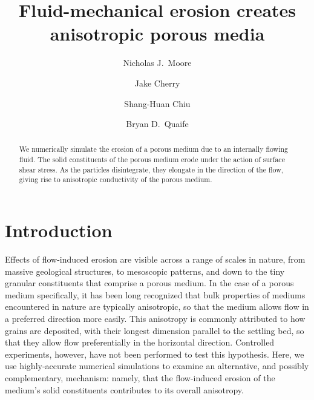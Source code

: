 \documentclass[3p]{elsarticle}
\begin{document}
\title{Fluid-mechanical erosion creates anisotropic porous media}



\author[Colgate]{Nicholas J.~Moore}

\author[FSU]{Jake Cherry}

\author[NJIT]{Shang-Huan Chiu}

\author[FSU]{Bryan D.~Quaife}

\address[Colgate]{Colgate University}
\address[FSU]{Florida State University}
\address[NJIT]{New Jersey Institute of Technology}

\begin{abstract}
We numerically simulate the erosion of a porous medium due to an internally flowing fluid.  The solid constituents of the porous medium erode under the action of surface shear stress. As the particles disintegrate, they elongate in the direction of the flow, giving rise to anisotropic conductivity of the porous medium.
\end{abstract}
\maketitle



\section{Introduction}

Effects of flow-induced erosion are visible across a range of scales in nature, from massive geological structures, to mesoscopic patterns, and down to the tiny granular constituents that comprise a porous medium. In the case of a porous medium specifically, it has been long recognized that bulk properties of mediums encountered in nature are typically anisotropic, so that the medium allows flow in a preferred direction more easily. This anisotropy is commonly attributed to how grains are deposited, with their longest dimension parallel to the settling bed, so that they allow flow preferentially in the horizontal direction. Controlled experiments, however, have not been performed to test this hypothesis. Here, we use highly-accurate numerical simulations to examine an alternative, and possibly complementary, mechanism: namely, that the flow-induced erosion of the medium's solid constituents contributes to its overall anisotropy.
\end{document}
